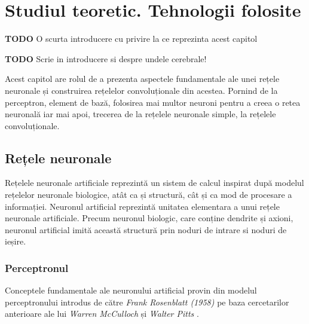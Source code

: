 \chapter{Studiul teoretic. Tehnologii folosite}\label{ch:2studiu_teoretic}
\textbf{TODO} O scurta introducere cu privire la ce reprezinta acest capitol

\textbf{TODO} Scrie in introducere si despre undele cerebrale!

Acest capitol are rolul de a prezenta aspectele fundamentale ale unei rețele neuronale și construirea rețelelor convoluționale din acestea. Pornind de la perceptron, element de bază, folosirea mai multor neuroni pentru a creea o retea neuronală iar mai apoi, trecerea de la rețelele neuronale simple, la rețelele convoluționale.

\section{Rețele neuronale}
Rețelele neuronale artificiale reprezintă un sistem de calcul inspirat după modelul rețelelor neuronale biologice, atât ca și structură, cât și ca mod de procesare a informației. Neuronul artificial reprezintă unitatea elementara a unui rețele neuronale artificiale. Precum neuronul biologic, care conține dendrite și axioni, neuronul artificial imită această structură prin noduri de intrare si noduri de ieșire.
\subsection{Perceptronul}
Conceptele fundamentale ale neuronului artificial provin din modelul perceptronului introdus de către \textit{Frank Rosenblatt (1958)} \cite{rosenblatt1962principles} pe baza cercetarilor anterioare ale lui \textit{Warren McCulloch} și \textit{Walter Pitts} \cite{McCulloch:427611}.

